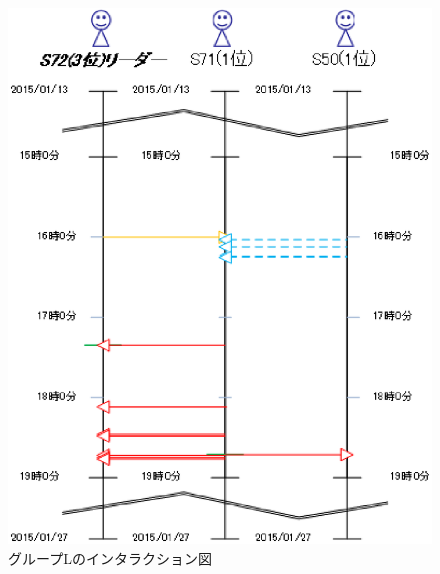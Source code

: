 \begin{figure}[tb]
	\begin{center}
		\includegraphics[scale=0.4]{img/flowL2.eps}
		\caption{グループLのインタラクション図}
		\label{fig:flowL2}
	\end{center}
\end{figure}


